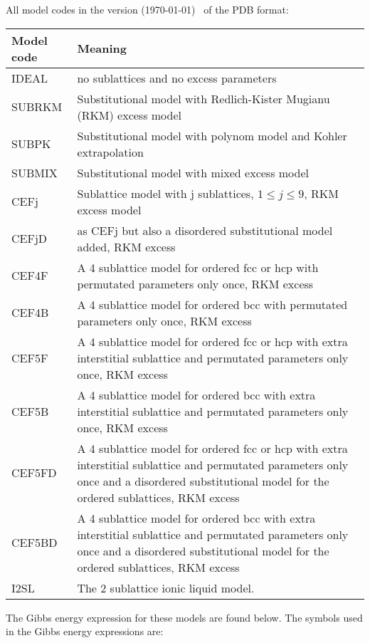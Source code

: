 \documentclass[12pt]{article}
\begin{document}
All model codes in the version (\today) ~of the PDB format:

\begin{tabular}{l p{130mm}}
Model code & Meaning\\\hline
IDEAL & no sublattices and no excess parameters\\
SUBRKM & Substitutional model with Redlich-Kister Mugianu (RKM) excess model\\
SUBPK  & Substitutional model with polynom model and Kohler extrapolation\\
SUBMIX & Substitutional model with mixed excess model\\
CEFj   & Sublattice model with j sublattices, $1\leq j\leq 9$, RKM excess model\\
CEFjD & as CEFj but also a disordered substitutional model added, RKM excess\\
CEF4F & A 4 sublattice model for ordered fcc or hcp with permutated parameters only once, RKM excess\\
CEF4B & A 4 sublattice model for ordered bcc with permutated parameters only once, RKM excess\\
CEF5F & A 4 sublattice model for ordered fcc or hcp with extra interstitial sublattice
and permutated parameters only once, RKM excess\\
CEF5B & A 4 sublattice model for ordered bcc with extra interstitial sublattice
and permutated parameters only once, RKM excess\\
CEF5FD & A 4 sublattice model for ordered fcc or hcp with extra interstitial sublattice
and permutated parameters only once and a disordered substitutional model for
the ordered sublattices, RKM excess\\
CEF5BD & A 4 sublattice model for ordered bcc with extra interstitial sublattice
and permutated parameters only once and a disordered substitutional model for
the ordered sublattices, RKM excess\\
I2SL & The 2 sublattice ionic liquid model.\\\hline
\end{tabular}

\bigskip

The Gibbs energy expression for these models are found below.  The
symbols used in the Gibbs energy expressions are:
\end{document}
